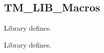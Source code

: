 \hypertarget{group___t_m___l_i_b___macros}{}\subsection{T\+M\+\_\+\+L\+I\+B\+\_\+\+Macros}
\label{group___t_m___l_i_b___macros}


Library defines.  


Library defines. 

